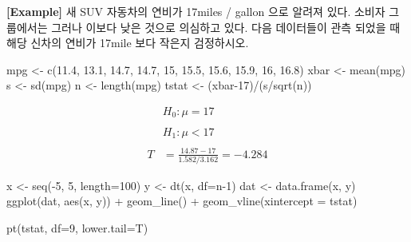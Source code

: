\documentclass[
]{book}
\newenvironment{Shaded}{\begin{snugshade}}{\end{snugshade}}
\newcommand{\AttributeTok}[1]{\textcolor[rgb]{0.77,0.63,0.00}{#1}}
\newcommand{\DecValTok}[1]{\textcolor[rgb]{0.00,0.00,0.81}{#1}}
\newcommand{\FloatTok}[1]{\textcolor[rgb]{0.00,0.00,0.81}{#1}}
\newcommand{\FunctionTok}[1]{\textcolor[rgb]{0.00,0.00,0.00}{#1}}
\newcommand{\NormalTok}[1]{#1}
\newcommand{\OtherTok}[1]{\textcolor[rgb]{0.56,0.35,0.01}{#1}}
\newcommand{\SpecialCharTok}[1]{\textcolor[rgb]{0.00,0.00,0.00}{#1}}
\begin{document}
\textbf{{[}Example{]}} 새 SUV 자동차의 연비가 17miles / gallon 으로 알려져 있다. 소비자 그룹에서는 그러나 이보다 낮은 것으로 의심하고 있다. 다음 데이터들이 관측 되었을 때 해당 신차의 연비가 17mile 보다 작은지 검정하시오.

\begin{Shaded}
\begin{Highlighting}[]
\NormalTok{mpg }\OtherTok{\textless{}{-}} \FunctionTok{c}\NormalTok{(}\FloatTok{11.4}\NormalTok{, }\FloatTok{13.1}\NormalTok{, }\FloatTok{14.7}\NormalTok{, }\FloatTok{14.7}\NormalTok{, }\DecValTok{15}\NormalTok{, }\FloatTok{15.5}\NormalTok{, }\FloatTok{15.6}\NormalTok{, }\FloatTok{15.9}\NormalTok{, }\DecValTok{16}\NormalTok{, }\FloatTok{16.8}\NormalTok{)}
\NormalTok{xbar }\OtherTok{\textless{}{-}} \FunctionTok{mean}\NormalTok{(mpg)}
\NormalTok{s }\OtherTok{\textless{}{-}} \FunctionTok{sd}\NormalTok{(mpg)}
\NormalTok{n }\OtherTok{\textless{}{-}} \FunctionTok{length}\NormalTok{(mpg)}
\NormalTok{tstat }\OtherTok{\textless{}{-}}\NormalTok{ (xbar}\DecValTok{{-}17}\NormalTok{)}\SpecialCharTok{/}\NormalTok{(s}\SpecialCharTok{/}\FunctionTok{sqrt}\NormalTok{(n))}
\end{Highlighting}
\end{Shaded}

\[
\begin{split}
&H_0: \mu = 17 \\
\\
&H_1: \mu < 17 \\
\\
T &= \frac{14.87 - 17}{1.582 / 3.162} =  -4.284
\end{split}
\]

\begin{Shaded}
\begin{Highlighting}[]
\NormalTok{x }\OtherTok{\textless{}{-}} \FunctionTok{seq}\NormalTok{(}\SpecialCharTok{{-}}\DecValTok{5}\NormalTok{, }\DecValTok{5}\NormalTok{, }\AttributeTok{length=}\DecValTok{100}\NormalTok{)}
\NormalTok{y }\OtherTok{\textless{}{-}} \FunctionTok{dt}\NormalTok{(x, }\AttributeTok{df=}\NormalTok{n}\DecValTok{{-}1}\NormalTok{)}
\NormalTok{dat }\OtherTok{\textless{}{-}} \FunctionTok{data.frame}\NormalTok{(x, y)}
\FunctionTok{ggplot}\NormalTok{(dat, }\FunctionTok{aes}\NormalTok{(x, y)) }\SpecialCharTok{+}
  \FunctionTok{geom\_line}\NormalTok{() }\SpecialCharTok{+}
  \FunctionTok{geom\_vline}\NormalTok{(}\AttributeTok{xintercept =}\NormalTok{ tstat)}

\FunctionTok{pt}\NormalTok{(tstat, }\AttributeTok{df=}\DecValTok{9}\NormalTok{, }\AttributeTok{lower.tail=}\NormalTok{T)}
\end{Highlighting}
\end{Shaded}
\end{document}

